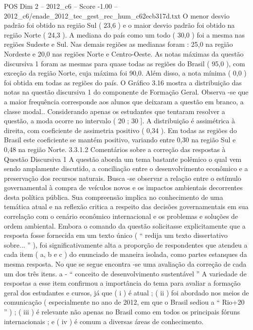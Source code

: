 \begin{textsample}{POS Dim 2 – 2012\_c6 – Score -1.00 – 2012\_c6/enade\_2012\_tec\_gest\_rec\_hum\_c62ecb317d.txt}
O menor desvio padrão foi obtido na região Sul ( 23,6 ) e o maior desvio padrão foi obtido na região Norte ( 24,3 ).
A mediana do país como um todo ( 30,0 ) foi a mesma nas regiões Sudeste e Sul.
Nas demais regiões as medianas foram : 25,0 na região Nordeste e 20,0 nas regiões Norte e Centro-Oeste.
As notas máximas da questão discursiva 1 foram as mesmas para quase todas as regiões do Brasil ( 95,0 ), com exceção da região Norte, cuja máxima foi 90,0.
Além disso, a nota mínima ( 0,0 ) foi obtida em todas as regiões do país.
O Gráfico 3.16 mostra a distribuição das notas na questão discursiva 1 do componente de Formação Geral.
Observa -se que a maior frequência corresponde aos alunos que deixaram a questão em branco, a classe modal..
Considerando apenas os estudantes que tentaram resolver a questão, a moda ocorre no intervalo ( 20 ; 30 ].
A distribuição é assimétrica à direita, com coeficiente de assimetria positivo ( 0,34 ).
Em todas as regiões do Brasil este coeficiente se mantém positivo, variando entre 0,30 na região Sul e 0,48 na região Norte. 3.3.1.2 Comentários sobre a correção das respostas à Questão Discursiva 1 A questão aborda um tema bastante polêmico o qual vem sendo amplamente discutido, a conciliação entre o desenvolvimento econômico e a preservação dos recursos naturais.
Busca -se observar a relação entre o estímulo governamental à compra de veículos novos e os impactos ambientais decorrentes desta política pública.
Sua compreensão implica no conhecimento de uma temática atual e na reflexão critica a respeito das decisões governamentais em sua correlação com o cenário econômico internacional e os problemas e soluções de ordem ambiental.
Embora o comando da questão solicitasse explicitamente que a resposta fosse fornecida em um texto único ( “ redija um texto dissertativo sobre... ” ), foi significativamente alta a proporção de respondentes que atendeu a cada item ( a, b e c ) do enunciado de maneira isolada, como partes estanques da mesma resposta.
No que se segue encontra -se uma avaliação da correção de cada um dos três itens. a - “ conceito de desenvolvimento sustentável ” A variedade de respostas a esse item confirmou a importância do tema para avaliar a formação geral dos estudantes e cursos, já que ( i ) é atual ; ( ii ) foi abordado nos meios de comunicação ( especialmente no ano de 2012, em que o Brasil sediou a “ Rio+20 ” ) ; ( iii ) é relevante não apenas no Brasil como em todos os principais fóruns internacionais ; e ( iv ) é comum a diversas áreas de conhecimento.

\end{textsample}
